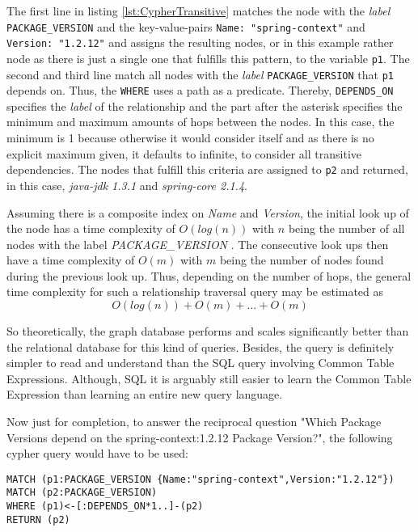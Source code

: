 The first line in listing \ref{lst:CypherTransitive} matches the node with the \emph{label} \lstinline|PACKAGE_VERSION| and the key-value-pairs \lstinline|Name: "spring-context"| and \lstinline|Version: "1.2.12"| and assigns the resulting nodes, or in this example rather node as there is just a single one that fulfills this pattern, to the variable \lstinline|p1|. The second and third line match all nodes with the \emph{label} \lstinline|PACKAGE_VERSION| that \lstinline|p1| depends on. Thus, the \lstinline|WHERE| uses a path as a predicate. Thereby, \lstinline|DEPENDS_ON| specifies the \emph{label} of the relationship and the part after the asterisk specifies the minimum and maximum amounts of hops between the nodes. In this case, the minimum is 1 because otherwise it would consider itself and as there is no explicit maximum given, it defaults to infinite, to consider all transitive dependencies. The nodes that fulfill this criteria are assigned to \lstinline|p2| and returned, in this case, \emph{java-jdk 1.3.1} and \emph{spring-core 2.1.4}.\par 
Assuming there is a composite index on \emph{Name} and \emph{Version}, the initial look up of the node has a time complexity of $O(log(n))$ with $n$ being the number of all nodes with the label \emph{PACKAGE\_VERSION} \cite{neo4j}. The consecutive look ups then have a time complexity of $O(m)$ with $m$ being the number of nodes found during the previous look up. Thus, depending on the number of hops, the general time complexity for such a relationship traversal query may be estimated as 
$$O(log(n)) + O(m) + ... + O(m)$$

So theoretically, the graph database performs and scales significantly better than the relational database for this kind of queries. Besides, the query is definitely simpler to read and understand than the SQL query involving Common Table Expressions. Although, SQL it is arguably still easier to learn the Common Table Expression than learning an entire new query language.\par 
Now just for completion, to answer the reciprocal question "Which Package Versions depend on the spring-context:1.2.12 Package Version?", the following cypher query would have to be used:

\begin{lstlisting}[caption=Package Version Reciprocal Dependencies (including transitive), captionpos=b, label=lst:CypherReciprocalTransitive]
MATCH (p1:PACKAGE_VERSION {Name:"spring-context",Version:"1.2.12"})
MATCH (p2:PACKAGE_VERSION)
WHERE (p1)<-[:DEPENDS_ON*1..]-(p2)
RETURN (p2)
\end{lstlisting}

